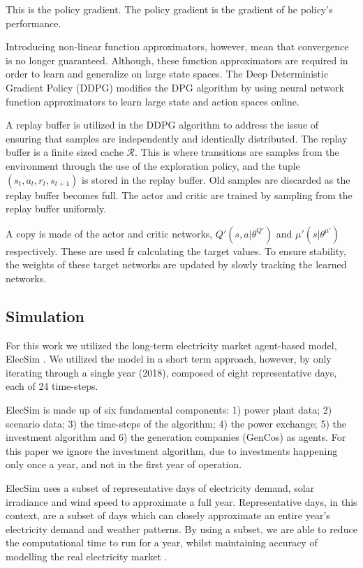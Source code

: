 \documentclass[conference]{IEEEtran}
\begin{document}
This is the policy gradient. The policy gradient is the gradient of he policy's performance. 

Introducing non-linear function approximators, however, mean that convergence is no longer guaranteed. Although, these function approximators are required in order to learn and generalize on large state spaces. The Deep Deterministic Gradient Policy (DDPG) modifies the DPG algorithm by using neural network function approximators to learn large state and action spaces online.

A replay buffer is utilized in the DDPG algorithm to address the issue of ensuring that samples are independently and identically distributed. The replay buffer is a finite sized cache $\mathcal{R}$. This is where transitions are samples from the environment through the use of the exploration policy, and the tuple $(s_t,a_t,r_t,s_{t+1})$ is stored in the replay buffer. Old samples are discarded as the replay buffer becomes full. The actor and critic are trained by sampling from the replay buffer uniformly. 

A copy is made of the actor and critic networks, $Q'(s,a|\theta^{Q'})$ and $\mu'(s|\theta^{\mu'})$ respectively. These are used fr calculating the target values. To ensure stability, the weights of these target networks are updated by slowly tracking the learned networks.

\subsection{Simulation}

For this work we utilized the long-term electricity market agent-based model, ElecSim \cite{Kell,Kell2020b}. We utilized the model in a short term approach, however, by only iterating through a single year (2018), composed of eight representative days, each of 24 time-steps.

ElecSim is made up of six fundamental components: 1) power plant data; 2) scenario data; 3) the time-steps of the algorithm; 4) the power exchange; 5) the investment algorithm and 6) the generation companies (GenCos) as agents. For this paper we ignore the investment algorithm, due to investments happening only once a year, and not in the first year of operation. 

ElecSim uses a subset of representative days of electricity demand, solar irradiance and wind speed to approximate a full year. Representative days, in this context, are a subset of days which can closely approximate an entire year's electricity demand and weather patterns. By using a subset, we are able to reduce the computational time to run for a year, whilst maintaining accuracy of modelling the real electricity market \cite{Kell2020}.
\end{document}
